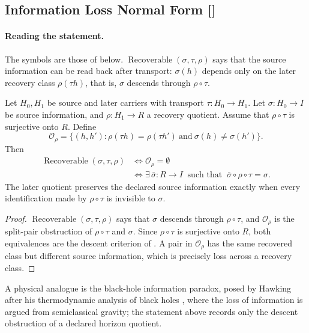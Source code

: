 \begin{description}
\end{description}
\endgroup


\subsection{Information Loss Normal Form [\texorpdfstring{}{F34}]}\label{sec:self-reference-limits:information-loss}

\paragraph{Reading the statement.} The symbols are those of  below.
\(\operatorname{Recoverable}(\sigma,\tau,\rho)\) says that the source
information can be read back after transport: \(\sigma(h)\) depends only
on the later recovery class \(\rho(\tau h)\), that is, \(\sigma\)
descends through \(\rho\circ\tau\).

\begin{theorem}\label{thm:F34}
Let \(H_0,H_1\) be source and later carriers with transport
\(\tau:H_0\to H_1\). Let \(\sigma:H_0\to I\) be source information,
and \(\rho:H_1\to R\) a recovery quotient. Assume that
\(\rho\circ\tau\) is surjective onto \(R\). Define
\[
  \mathcal O_\rho
  =\{(h,h'):\rho(\tau h)=\rho(\tau h')\ \text{and}\
      \sigma(h)\ne\sigma(h')\}.
\]
Then
\begin{align*}
  \operatorname{Recoverable}(\sigma,\tau,\rho)
  &\iff \mathcal O_\rho=\emptyset\\
  &\iff
  \exists\,\bar\sigma:R\to I\ \text{ such that }\
    \bar\sigma\circ\rho\circ\tau=\sigma .
\end{align*}
The later quotient preserves the declared source information exactly
when every identification made by \(\rho\circ\tau\) is invisible to
\(\sigma\).
\end{theorem}
\begin{proof}
\(\operatorname{Recoverable}(\sigma,\tau,\rho)\) says that \(\sigma\)
descends through \(\rho\circ\tau\), and \(\mathcal O_\rho\) is the
split-pair obstruction of \(\rho\circ\tau\) and \(\sigma\).  Since
\(\rho\circ\tau\) is surjective onto \(R\), both equivalences are the
descent criterion of \Cref{sec:apparatus}.  A pair in
\(\mathcal O_\rho\) has the same recovered class but different source
information, which is precisely loss across a recovery class.
\end{proof}

A physical analogue is the black-hole information paradox, posed by Hawking \citep{Hawking1976Breakdown} after his thermodynamic analysis of black holes \citep{Hawking1976BHThermodynamics}, where the loss of information is argued
from semiclassical gravity; the statement above records only the descent
obstruction of a declared horizon quotient.

